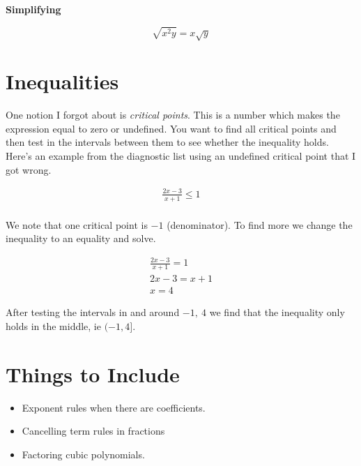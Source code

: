 \documentclass{article}
\begin{document}
\textbf{Simplifying}

$$
\sqrt{x^2y} = x\sqrt{y}
$$
\section{Inequalities}

One notion I forgot about is \emph{critical points}. This is a number which makes the
expression equal to zero or undefined. You want to find all critical points and then test
in the intervals between them to see whether the inequality holds. Here's an example from
the diagnostic list using an undefined critical point that I got wrong.

\begin{align*}
    \frac{2x-3}{x+1} \leq 1\\
\end{align*}

We note that one critical point is $-1$ (denominator). To find more we change the
inequality to an equality and solve.

\begin{align*}
    \frac{2x-3}{x+1} = 1\\
    2x-3 = x+1\\
    x = 4
\end{align*}

After testing the intervals in and around $-1,~4$ we find that the inequality only holds
in the middle, ie $(-1, 4]$.


\section{Things to Include}

\begin{itemize}
    \item Exponent rules when there are coefficients.
    \item Cancelling term rules in fractions
    \item Factoring cubic polynomials.
\end{itemize}
\end{document}
